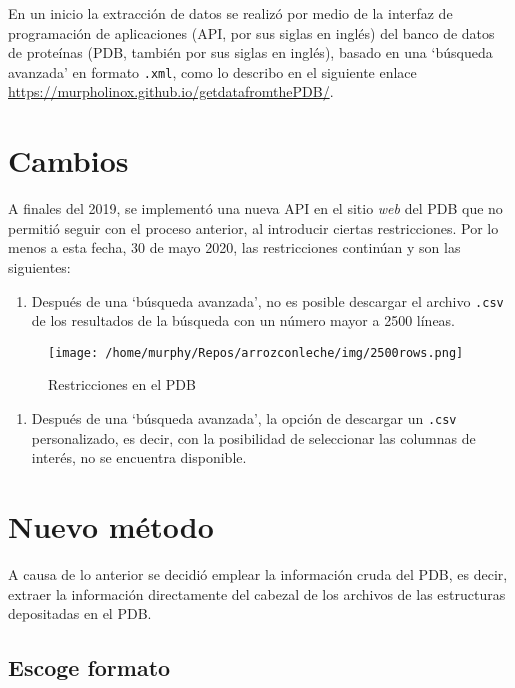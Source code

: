\documentclass[
]{book}
\providecommand{\tightlist}{%
  \setlength{\itemsep}{0pt}\setlength{\parskip}{0pt}}
\begin{document}
En un inicio la extracción de datos se realizó por medio de la interfaz de programación de aplicaciones (API, por sus siglas en inglés) del banco de datos de proteínas (PDB, también por sus siglas en inglés), basado en una `búsqueda avanzada' en formato \texttt{.xml}, como lo describo en el siguiente enlace \url{https://murpholinox.github.io/getdatafromthePDB/}.

\hypertarget{cambios}{%
\section{Cambios}\label{cambios}}

A finales del 2019, se implementó una nueva API en el sitio \emph{web} del PDB que no permitió seguir con el proceso anterior, al introducir ciertas restricciones. Por lo menos a esta fecha, 30 de mayo 2020, las restricciones continúan y son las siguientes:

\begin{enumerate}
\def\labelenumi{\arabic{enumi}.}
\tightlist
\item
  Después de una `búsqueda avanzada', no es posible descargar el archivo \texttt{.csv} de los resultados de la búsqueda con un número mayor a 2500 líneas.
\end{enumerate}

\begin{figure}
\centering
\texttt{[image: /home/murphy/Repos/arrozconleche/img/2500rows.png]}
\caption{Restricciones en el PDB}
\end{figure}

\begin{enumerate}
\def\labelenumi{\arabic{enumi}.}
\setcounter{enumi}{1}
\tightlist
\item
  Después de una `búsqueda avanzada', la opción de descargar un \texttt{.csv} personalizado, es decir, con la posibilidad de seleccionar las columnas de interés, no se encuentra disponible.
\end{enumerate}

\hypertarget{nuevo-muxe9todo}{%
\section{Nuevo método}\label{nuevo-muxe9todo}}

A causa de lo anterior se decidió emplear la información cruda del PDB, es decir, extraer la información directamente del cabezal de los archivos de las estructuras depositadas en el PDB.

\hypertarget{escoge-formato}{%
\subsection{Escoge formato}\label{escoge-formato}}
\end{document}
